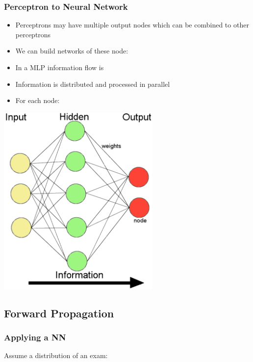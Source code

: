 \documentclass[
../../EiKI_Summary.tex,
]
{subfiles}
\begin{document}
\subsubsection{Perceptron to Neural Network}
\begin{minipage}
    [t]{0.4\textwidth}
    \begin{itemize}
        \item Perceptrons may have multiple output nodes which can be combined to other perceptrons
        \item We can build networks of these node: 
        \item In a MLP information flow is 
        \item Information is distributed and processed in parallel
        \item For each node:\\ 
    \end{itemize}
\end{minipage}
\begin{minipage}
    [t]{0.6\textwidth}
    \begin{center}
        \includegraphics[valign=T,width=0.6\textwidth]{Pics/11/MLP.png}
    \end{center}
\end{minipage}

\subsection{Forward Propagation}
\subsubsection{Applying a NN}
Assume a distribution of an exam:
\end{document}
